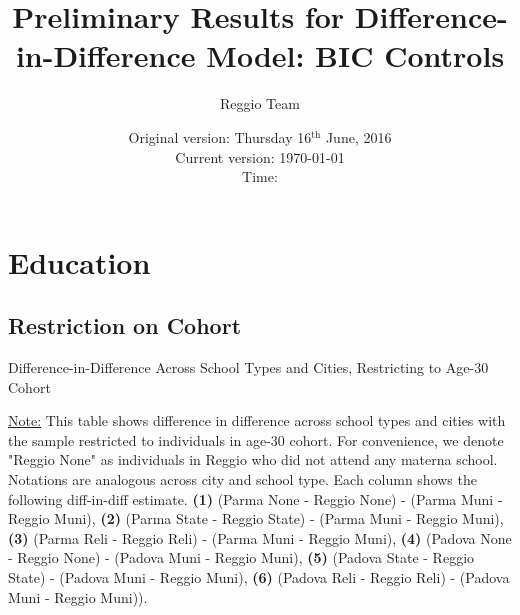 \documentclass[11pt]{article}
\begin{document}
\title{Preliminary Results for Difference-in-Difference Model: BIC Controls}
\author{Reggio Team}
\date{Original version: Thursday  16$^{\text{th}}$ June, 2016 \\ Current version: \today \\ \vspace{1em} Time: \currenttime}
\maketitle

\listoftables

\doublespacing

\section{Education}
\subsection{Restriction on Cohort}
\begin{table}[H]
\begin{center}
	\caption{Difference-in-Difference Across School Types and Cities, Restricting to Age-30 Cohort}
	\scalebox{0.80}{
		}
\end{center}
\footnotesize
\underline{Note:} This table shows difference in difference across school types and cities with the sample restricted to individuals in age-30 cohort. For convenience, we denote "Reggio None" as individuals in Reggio who did not attend any materna school. Notations are analogous across city and school type. Each column shows the following diff-in-diff estimate. \textbf{(1)} (Parma None - Reggio None) - (Parma Muni - Reggio Muni), \textbf{(2)} (Parma State - Reggio State) - (Parma Muni - Reggio Muni), \textbf{(3)} (Parma Reli - Reggio Reli) - (Parma Muni - Reggio Muni), \textbf{(4)} (Padova None - Reggio None) - (Padova Muni - Reggio Muni),  \textbf{(5)} (Padova State - Reggio State) - (Padova Muni - Reggio Muni), \textbf{(6)} (Padova Reli - Reggio Reli) - (Padova Muni - Reggio Muni)). 
\end{table}
\end{document}
